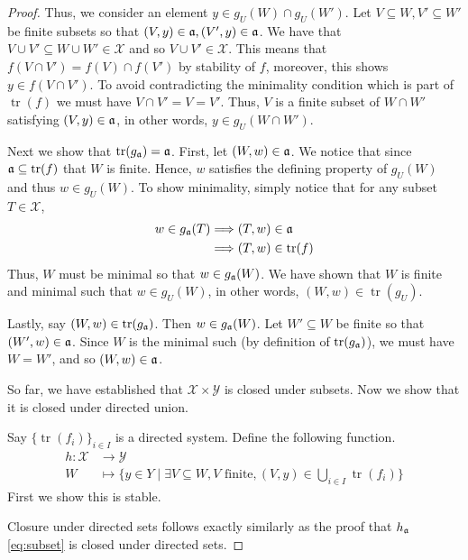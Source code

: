 \documentclass[12pt]{article}
\theoremstyle{plain}
\theoremstyle{definition}
\newcommand{\scr}[1]{\mathscr{#1}}
\newcommand{\lto}{\longrightarrow}
\begin{document}
\begin{proof}
		Thus, we consider an element $y \in g_U(W) \cap g_U(W')$. Let $V \subseteq W, V' \subseteq W'$ be finite subsets so that $(V, y) \in \frak{a}, (V', y)\in \frak{a}$. We have that $V \cup V' \subseteq W \cup W' \in \scr{X}$ and so $V \cup V' \in \scr{X}$. This means that $f(V \cap V') = f(V) \cap f(V')$ by stability of $f$, moreover, this shows $y \in f(V \cap V')$. To avoid contradicting the minimality condition which is part of $\operatorname{tr}(f)$ we must have $V \cap V' = V = V'$. Thus, $V$ is a finite subset of $W \cap W'$ satisfying $(V, y) \in \frak{a}$, in other words, $y \in g_U(W \cap W')$.
		
		Next we show that $\operatorname{tr}(g_{\frak{a}}) = \frak{a}$. First, let $(W, w) \in \frak{a}$. We notice that since $\frak{a} \subseteq \operatorname{tr}(f)$ that $W$ is finite. Hence, $w$ satisfies the defining property of $g_U(W)$ and thus $w \in g_U(W)$. To show minimality, simply notice that for any subset $T \in \scr{X}$,
		\begin{align*}
			w \in g_{\frak{a}}(T) &\Longrightarrow (T,w) \in \frak{a}\\
			&\Longrightarrow (T,w) \in \operatorname{tr}(f)
			\end{align*}
		Thus, $W$ must be minimal so that $w \in g_{\frak{a}}(W)$. We have shown that $W$ is finite and minimal such that $w \in g_U(W)$, in other words, $(W,w) \in \operatorname{tr}(g_U)$.
		
		Lastly, say $(W,w) \in \operatorname{tr}(g_{\frak{a}})$. Then $w \in g_{\frak{a}}(W)$. Let $W' \subseteq W$ be finite so that $(W', w) \in \frak{a}$. Since $W$ is the minimal such (by definition of $\operatorname{tr}(g_{\frak{a}})$), we must have $W = W'$, and so $(W,w) \in \frak{a}$.
		
		So far, we have established that $\scr{X} \times \scr{Y}$ is closed under subsets. Now we show that it is closed under directed union.
		
		Say $\{ \operatorname{tr}(f_i) \}_{i \in I}$ is a directed system. Define the following function.
		\begin{align*}
			h: \scr{X} &\lto \scr{Y}\\
			W &\longmapsto \{ y \in Y \mid \exists V \subseteq W, V\text{ finite}, (V,y) \in \bigcup_{i \in I}\operatorname{tr}(f_i) \}
			\end{align*}
		First we show this is stable.
		
		Closure under directed sets follows exactly similarly as the proof that $h_{\frak{a}}$ \eqref{eq:subset} is closed under directed sets.
		

\end{proof}
\end{document}
